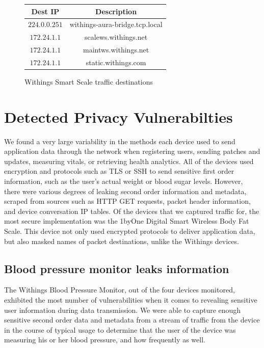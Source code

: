 \begin{figure}
  \caption{Withings Smart Scale traffic destinations}
  \begin{center}
    \begin{tabular}{c|c} 
    \textbf{Dest IP} & \textbf{Description} \\ [0.5ex] 
    \hline
    $224.0.0.251$ & withings-aura-bridge.tcp.local \\ 
    \hline
    $172.24.1.1$ & scalews.withings.net \\
    \hline
    $172.24.1.1$ & maintws.withings.net \\
    \hline
    $172.24.1.1$ & static.withings.com \\ [1ex] 
    \end{tabular}
  \end{center}
\end{figure}

\section{Detected Privacy Vulnerabilties}

We found a very large variability in the methods each device used to send application data through the network when registering users, sending patches and updates, measuring vitals, or retrieving health analytics. All of the devices used encryption and protocols such as TLS or SSH to send sensitive first order information, such as the user's actual weight or blood sugar levels. However, there were various degrees of leaking second order information and metadata, scraped from sources such as HTTP GET requests, packet header information, and device conversation IP tables. Of the devices that we captured traffic for, the most secure implementation was the 1byOne Digital Smart Wireless Body Fat Scale. This device not only used encrypted protocols to deliver application data, but also masked names of packet destinations, unlike the Withings devices. 

\subsection{Blood pressure monitor leaks information}
The Withings Blood Pressure Monitor, out of the four devices monitored, exhibited the most number of vulnerabilities when it comes to revealing sensitive user information during data transmission. We were able to capture enough sensitive second order data and metadata from a stream of traffic from the device in the course of typical usage to determine that the user of the device was measuring his or her blood pressure, and how frequently as well. 


